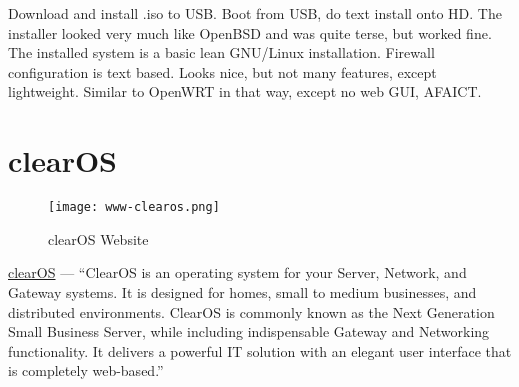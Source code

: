 Download and install .iso to USB. Boot from USB, do text install onto HD. The installer looked very much like OpenBSD and was quite terse, but worked fine.
The installed system is a basic lean GNU/Linux installation. Firewall configuration is text based. Looks nice, but not many features, except lightweight.
Similar to OpenWRT in that way, except no web GUI, AFAICT.


\section{clearOS}

\begin{figure}[h!]
\texttt{[image: www-clearos.png]}
 \caption{clearOS Website}
 \label{fig:www-clearos}
\end{figure}

\href{https://www.clearos.com/}{clearOS} --- ``ClearOS is an operating system for your Server, Network, and Gateway systems. It is designed for homes, small to medium businesses, and distributed environments. ClearOS is commonly known as the Next Generation Small Business Server, while including indispensable Gateway and Networking functionality. It delivers a powerful IT solution with an elegant user interface that is completely web-based.''

